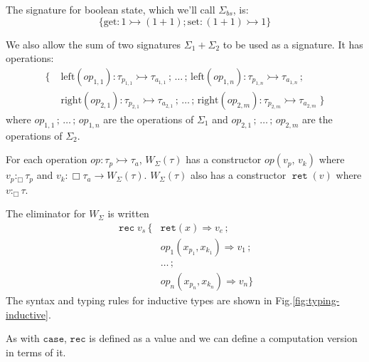 \documentclass[acmsmall, screen, review, anonymous]{acmart}
\theoremstyle{definition}
\newcommand{\glob}{\mathop{\Box}}
\newcommand{\arr}{\rightarrow}
\newcommand{\ind}[1]{W_{#1}}
\newcommand{\indintro}[3]{{#1}(#2,\, #3)}
\newcommand{\retname}{\mathtt{ret}}
\newcommand{\ret}[1]{\mathop{\retname}(#1)}
\newcommand{\indelimname}{\mathtt{rec}}
\newcommand{\indelim}[2]{\mathop{\indelimname} #1 \,\{#2\}}
\newcommand{\indretcase}[2]{\retname(#1) \Rightarrow #2}
\newcommand{\indcase}[4]{#1(#2, #3) \Rightarrow #4}
\newcommand{\seq}{\,;\,}
\newcommand{\casename}{\mathtt{case}}
\newcommand{\types}{\mathrel{:}}
\newcommand{\gtypes}{\mathrel{:_{\Box}}}
\begin{document}
\begin{example}
  The signature for boolean state, which we'll call $\Sigma_{bs}$,
  is:
  \begin{equation*}
    \{ \mathrm{get} \types 1 \rightarrowtail (1 + 1);
       \mathrm{set} \types (1 + 1) \rightarrowtail 1 \}
  \end{equation*}
\end{example}

We also allow the sum of two signatures $\Sigma_1 + \Sigma_2$ to be used
as a signature. It has operations:
\begin{align*}
\{ \; &\mathrm{left}(op_{1,1}) \types \tau_{p_{1,1}} \rightarrowtail \tau_{a_{1,1}}
        \seq \ldots \seq
        \mathrm{left}(op_{1, n}) \types \tau_{p_{1, n}} \rightarrowtail \tau_{a_{1, n}}
        \seq \\
      &\mathrm{right}(op_{2, 1}) \types \tau_{p_{2, 1}} \rightarrowtail \tau_{a_{2,1}}
        \seq \ldots \seq
        \mathrm{right}(op_{2, m}) \types \tau_{p_{2, m}} \rightarrowtail \tau_{a_{2, m}}
        \; \}
\end{align*}
where $op_{1,1} \seq \ldots \seq op_{1,n}$ are the operations of
$\Sigma_1$ and $op_{2,1} \seq \ldots \seq op_{2,m}$ are the operations
of $\Sigma_2$.

For each operation $op \types \tau_p \rightarrowtail \tau_a$,
$\ind{\Sigma}(\tau)$ has a constructor $\indintro{op}{v_p}{v_k}$
where $v_p \gtypes \tau_p$ and
$v_k \types \glob \tau_a \arr \ind{\Sigma}(\tau)$. $\ind{\Sigma}(\tau)$
also has a constructor $\ret{v}$ where $v \gtypes \tau$.

The eliminator for $\ind{\Sigma}$ is written
\begin{align*}
\indelim{v_s}
  {&\indretcase{x}{v_e} \seq \\
   &\indcase{op_1}{x_{p_1}}{x_{k_1}}{v_1} \seq \\
   &\ldots \seq \\
   &\indcase{op_n}{x_{p_n}}{x_{k_n}}{v_n}}
\end{align*}
The syntax and typing rules for inductive types are shown in
Fig.\ref{fig:typing-inductive}.

As with $\casename$, $\indelimname$ is defined as a value and we can
define a computation version in terms of it.
\end{document}
